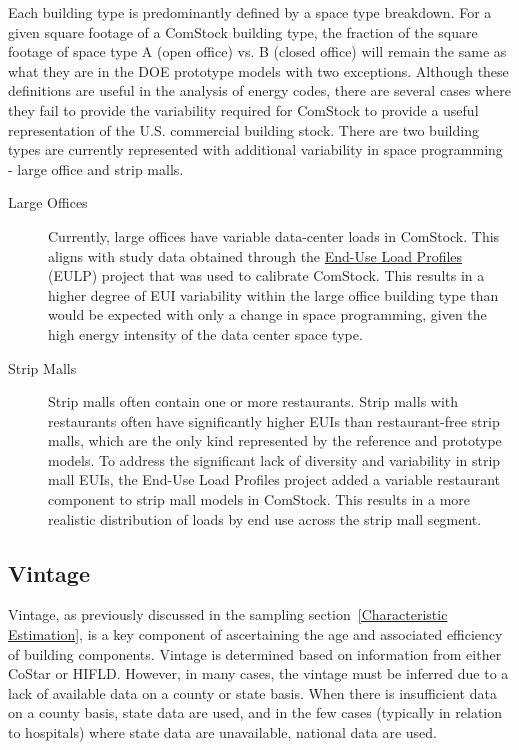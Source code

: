 Each building type is predominantly defined by a space type breakdown. For a given square footage of a ComStock building type, the fraction of the square footage of space type A (open office) vs. B (closed office) will remain the same as what they are in the DOE prototype models with two exceptions. Although these definitions are useful in the analysis of energy codes, there are several cases where they fail to provide the variability required for ComStock to provide a useful representation of the U.S. commercial building stock. There are two building types are currently represented with additional variability in space programming - large office and strip malls.

\begin{description}
\item[Large Offices] Currently, large offices have variable data-center loads in ComStock. This aligns with study data obtained through the \href{https://www.nrel.gov/docs/fy22osti/80889.pdf}{End-Use Load Profiles} (EULP) project that was used to calibrate ComStock. This results in a higher degree of EUI variability within the large office building type than would be expected with only a change in space programming, given the high energy intensity of the data center space type.
\item[Strip Malls] Strip malls often contain one or more restaurants. Strip malls with restaurants often have significantly higher EUIs than restaurant-free strip malls, which are the only kind represented by the reference and prototype models. To address the significant lack of diversity and variability in strip mall EUIs, the End-Use Load Profiles project added a variable restaurant component to strip mall models in ComStock. This results in a more realistic distribution of loads by end use across the strip mall segment.
\end{description}

\subsection{Vintage}

Vintage, as previously discussed in the sampling section~\ref{Characteristic Estimation}, is a key component of ascertaining the age and associated efficiency of building components. Vintage is determined based on information from either CoStar or HIFLD. However, in many cases, the vintage must be inferred due to a lack of available data on a county or state basis. When there is insufficient data on a county basis, state data are used, and in the few cases (typically in relation to hospitals) where state data are unavailable, national data are used.

